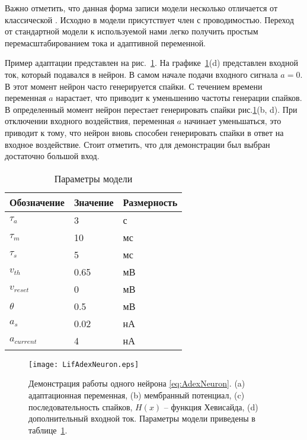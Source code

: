\documentclass{article}
\begin{document}
Важно отметить, что данная форма записи модели несколько отличается от классической \cite{brette2005adaptive}. Исходно в модели присутствует член с проводимостью. Переход от стандартной модели к используемой нами легко получить простым перемасштабированием тока и адаптивной переменной. 

Пример адаптации представлен на рис.~\ref{fig:LifAdexNeuron}. На графике~\ref{fig:LifAdexNeuron}(d) представлен входной ток, который подавался в нейрон. В самом начале подачи входного сигнала $a = 0$. В этот момент нейрон часто генерируется спайки. С течением времени переменная $a$ нарастает, что приводит к уменьшению частоты генерации спайков. В определенный момент нейрон перестает генерировать спайки рис.\ref{fig:LifAdexNeuron}(b, d). При отключении входного воздействия, переменная $a$ начинает уменьшаться, это приводит к тому, что нейрон вновь способен генерировать спайки в ответ на входное воздействие. Стоит отметить, что для демонстрации был выбран достаточно большой вход.

\begin{table}[h!]
  \caption{Параметры модели}
  \centering
  \begin{tabular}{lll}
    \toprule
    Обозначение   & Значение & Размерность \\
    \midrule
    $\tau_a$      & 3        & с           \\
    $\tau_m$      & 10       & мс          \\
    $\tau_s$      & 5        & мс          \\
    $v_{th}$      & 0.65     & мВ          \\
    $v_{reset}$   & 0        & мВ          \\
    $\theta$      & 0.5      & мВ          \\
    $a_s$         & 0.02     & нА          \\
    $a_{current}$ & 4        & нА          \\
    \bottomrule
  \end{tabular}
  \label{tab:modelParameters}
\end{table}

\begin{figure}[h!] \label{fig:LifAdexNeuron}
  \begin{center}
    \texttt{[image: LifAdexNeuron.eps]}
    \caption{Демонстрация работы одного нейрона \ref{eq:AdexNeuron}. (a) адаптационная переменная, (b) мембранный потенциал, (c) последовательность спайков, $H(x)$ -- функция Хевисайда, (d) дополнительный входной ток. Параметры модели приведены в таблице~\ref{tab:modelParameters}.}
  \end{center}
\end{figure}
\end{document}
